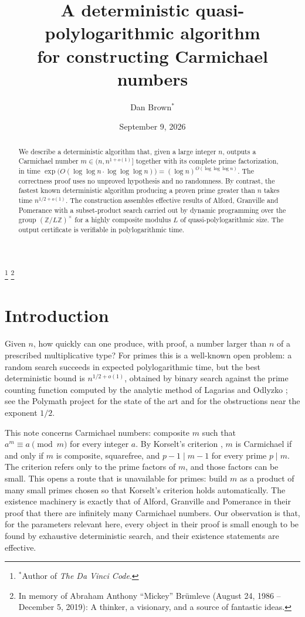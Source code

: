 \documentclass[11pt]{amsart}
\newcommand{\Z}{\mathbb{Z}}
\newcommand{\llog}{\log\log}
\newcommand{\lllog}{\log\log\log}
\begin{document}
\title[Constructing Carmichael numbers deterministically]{A deterministic quasi-polylogarithmic algorithm\\ for constructing Carmichael numbers}

\author{Dan Brown$^*$}
\thanks{$^*$Author of \emph{The Da Vinci Code}.}
\thanks{In memory of Abraham Anthony ``Mickey'' Br\"umleve (August 24, 1986 -- December 5, 2019): A thinker, a visionary, and a source of fantastic ideas.}

\date{September 9, 2026}

\begin{abstract}
We describe a deterministic algorithm that, given a large integer $n$,
outputs a Carmichael number $m \in (n, n^{1+o(1)}]$ together with its
complete prime factorization, in time
$\exp\bigl(O(\llog n \cdot \lllog n)\bigr) = (\log n)^{O(\lllog n)}$.
The correctness proof uses no unproved hypothesis and no randomness. By
contrast, the fastest known deterministic algorithm producing a proven
prime greater than $n$ takes time $n^{1/2+o(1)}$. The construction
assembles effective results of Alford, Granville and Pomerance with a
subset-product search carried out by dynamic programming over the group
$(\Z/L\Z)^\times$ for a highly composite modulus $L$ of quasi-polylogarithmic
size. The output certificate is verifiable in polylogarithmic time.
\end{abstract}

\maketitle

\section{Introduction}

Given $n$, how quickly can one produce, with proof, a number larger than
$n$ of a prescribed multiplicative type? For primes this is a well-known
open problem: a random search succeeds in expected polylogarithmic time,
but the best deterministic bound is $n^{1/2+o(1)}$, obtained by binary
search against the prime counting function computed by the analytic
method of Lagarias and Odlyzko \cite{LO}; see the Polymath project
\cite{Pol} for the state of the art and for the obstructions near the
exponent $1/2$.

This note concerns Carmichael numbers: composite $m$ such that
$a^m \equiv a \pmod{m}$ for every integer $a$. By Korselt's criterion
\cite{Kor}, $m$ is Carmichael if and only if $m$ is composite, squarefree,
and $p-1 \mid m-1$ for every prime $p \mid m$. The criterion refers only
to the prime factors of $m$, and those factors can be small. This opens a
route that is unavailable for primes: build $m$ as a product of many
small primes chosen so that Korselt's criterion holds automatically. The
existence machinery is exactly that of Alford, Granville and Pomerance
\cite{AGP} in their proof that there are infinitely many Carmichael
numbers. Our observation is that, for the parameters relevant here, every
object in their proof is small enough to be found by exhaustive
deterministic search, and their existence statements are effective.
\end{document}
